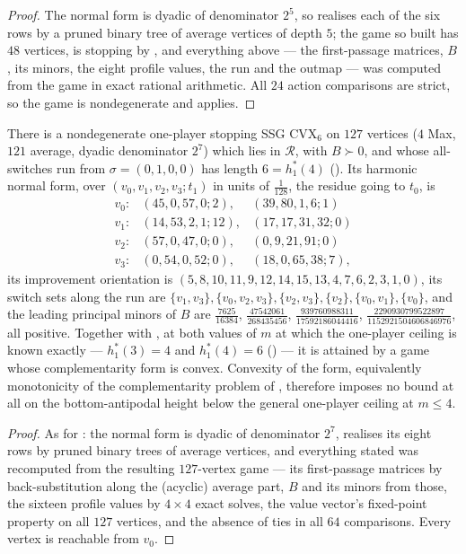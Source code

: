 \begin{proof}
The normal form is dyadic of denominator $2^{5}$, so 
realises each of the six rows by a pruned binary tree of average vertices of
depth $5$; the game so built has $48$ vertices, is stopping by
, and everything above --- the first-passage matrices,
$B$, its minors, the eight profile values, the run and the outmap --- was
computed from the game in exact rational arithmetic. All $24$ action
comparisons are strict, so the game is nondegenerate and
 applies.
\end{proof}

\begin{theorem}\label{vr:ceiling}
There is a nondegenerate one-player stopping SSG $\mathrm{CVX}_6$ on $127$
vertices ($4$ Max, $121$ average, dyadic denominator $2^{7}$) which lies in
$\mathcal R$, with $B\succ0$, and whose all-switches run from
$\sigma=(0,1,0,0)$ has length $6=h^{\ast}_{1}(4)$
(). Its harmonic normal form, over
$(v_0,v_1,v_2,v_3;t_1)$ in units of $\tfrac1{128}$, the residue going to
$t_0$, is
\[
 \begin{array}{lll}
  v_0:&(45,0,57,0;2),&(39,80,1,6;1)\\
  v_1:&(14,53,2,1;12),&(17,17,31,32;0)\\
  v_2:&(57,0,47,0;0),&(0,9,21,91;0)\\
  v_3:&(0,54,0,52;0),&(18,0,65,38;7),
 \end{array}
\]
its improvement orientation is
$(5,8,10,11,9,12,14,15,13,4,7,6,2,3,1,0)$, its switch sets along the run
are $\{v_1,v_3\},\{v_0,v_2,v_3\},\{v_2,v_3\},\{v_2\},\{v_0,v_1\},\{v_0\}$,
and the leading principal minors of $B$ are
$\tfrac{7625}{16384}$, $\tfrac{47542061}{268435456}$,
$\tfrac{939760988311}{17592186044416}$,
$\tfrac{2290930799522897}{1152921504606846976}$, all positive.
Together with , at both values of $m$ at which the
one-player ceiling is known exactly --- $h^{\ast}_{1}(3)=4$ and
$h^{\ast}_{1}(4)=6$ () --- it is attained by a game
whose complementarity form is convex. Convexity of the form, equivalently
monotonicity of the complementarity problem of , therefore
imposes no bound at all on the bottom-antipodal height below the general
one-player ceiling at $m\le4$.
\end{theorem}

\begin{proof}
As for : the normal form is dyadic of denominator
$2^{7}$,  realises its eight rows by pruned binary
trees of average vertices, and everything stated was recomputed from the
resulting $127$-vertex game --- its first-passage matrices by
back-substitution along the (acyclic) average part, $B$ and its minors from
those, the sixteen profile values by $4\times4$ exact solves, the value
vector's fixed-point property on all $127$ vertices, and the absence of ties
in all $64$ comparisons. Every vertex is reachable from $v_0$.
\end{proof}

